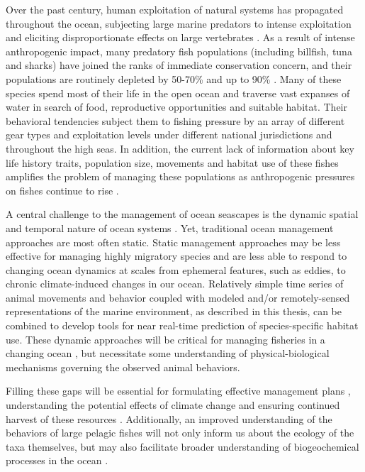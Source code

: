Over the past century, human exploitation of natural systems has propagated throughout the ocean, subjecting large marine predators to intense exploitation \citep{Byrne2017} and eliciting disproportionate effects on large vertebrates \citep{Jackson2001, Baum2003}. As a result of intense anthropogenic impact, many predatory fish populations (including billfish, tuna and sharks) have joined the ranks of immediate conservation concern, and their populations are routinely depleted by 50-70\% \citep{Hilborn2003} and up to 90\% \citep{Myers2005}. Many of these species spend most of their life in the open ocean and traverse vast expanses of water in search of food, reproductive opportunities and suitable habitat. Their behavioral tendencies subject them to fishing pressure by an array of different gear types and exploitation levels under different national jurisdictions and throughout the high seas. In addition, the current lack of information about key life history traits, population size, movements and habitat use of these fishes amplifies the problem of managing these populations as anthropogenic pressures on fishes continue to rise \citep{Dulvy2008, Ferretti2010}.

A central challenge to the management of ocean seascapes is the dynamic spatial and temporal nature of ocean systems \citep{Lewison2015}. Yet, traditional ocean management approaches are most often static. Static management approaches may be less effective for managing highly migratory species and are less able to respond to changing ocean dynamics at scales from ephemeral features, such as eddies, to chronic climate-induced changes in our ocean. Relatively simple time series of animal movements and behavior coupled with modeled and/or remotely-sensed representations of the marine environment, as described in this thesis, can be combined to develop tools for near real-time prediction of species-specific habitat use. These dynamic approaches will be critical for managing fisheries in a changing ocean \citep{Maxwell2015}, but necessitate some understanding of physical-biological mechanisms governing the observed animal behaviors.

Filling these gaps will be essential for formulating effective management plans \citep{Cullis-Suzuki2010}, understanding the potential effects of climate change \citep{Hazen2012} and ensuring continued harvest of these resources \citep{Pauly1998, Watson2013}. Additionally, an improved understanding of the behaviors of large pelagic fishes will not only inform us about the ecology of the taxa themselves, but may also facilitate broader understanding of biogeochemical processes in the ocean \citep{Lavery2010a, Roman2010}.

